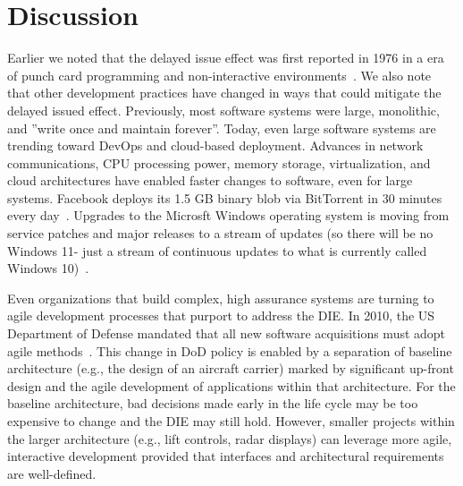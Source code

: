 \documentclass[smallcondensed]{svjour3}
\begin{document}
 
 \section{Discussion}

Earlier we noted that the delayed issue effect was first reported in 1976 in a era of punch card programming and non-interactive environments~\cite{Boehm76}. We also note that other development practices have changed in ways that could   mitigate the delayed issued effect.  Previously,
most software systems were large, monolithic, and ''write once and maintain
forever''. Today, even large software systems are trending toward DevOps and cloud-based deployment. Advances in network communications, CPU processing power, memory storage, virtualization, and cloud architectures have enabled faster changes to software, even for large systems. Facebook deploys its 1.5 GB binary blob via BitTorrent in 30 minutes every day~\cite{Facebook}. 
Upgrades to the Microsft Windows operating system is moving from service patches and major releases to a stream of updates (so there will be no Windows 11- just a stream of continuous updates to what is currently called Windows 10)~\cite{bright15}.


Even organizations that build complex, high assurance systems are turning to agile development processes that purport to address the DIE. In 2010, the US Department of Defense mandated
that all new software acquisitions must adopt agile methods~\cite{kim13}. 
This change in DoD policy is enabled by a separation of baseline architecture
(e.g., the design of an 
aircraft carrier) marked by significant up-front design and the agile development of applications within that architecture.
For the baseline architecture, bad decisions
made early in the life cycle may be too expensive to change and the DIE may still hold.
However, smaller projects within the larger architecture (e.g., lift controls, radar displays) can leverage more agile, interactive development provided that interfaces and architectural requirements are well-defined. 
 
\end{document}
